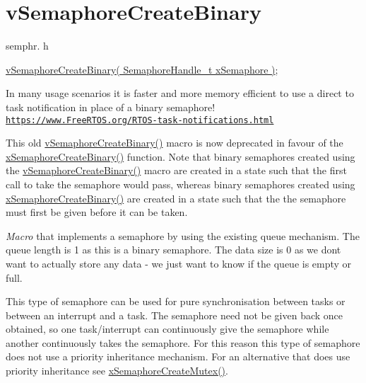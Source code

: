 \hypertarget{group__v_semaphore_create_binary}{}\section{v\+Semaphore\+Create\+Binary}
\label{group__v_semaphore_create_binary}
semphr. h 
\begin{DoxyPre}
\hyperlink{vendor_2ceedling_2plugins_2freertos_2src_2freertos_2include_2semphr_8h_ae10bffadd26fbd5bcce76bf33a83ef30}{vSemaphoreCreateBinary( SemaphoreHandle\_t xSemaphore )};
\end{DoxyPre}


In many usage scenarios it is faster and more memory efficient to use a direct to task notification in place of a binary semaphore! \href{https://www.FreeRTOS.org/RTOS-task-notifications.html}{\tt https\+://www.\+Free\+R\+T\+O\+S.\+org/\+R\+T\+O\+S-\/task-\/notifications.\+html}

This old \hyperlink{vendor_2ceedling_2plugins_2freertos_2src_2freertos_2include_2semphr_8h_ae10bffadd26fbd5bcce76bf33a83ef30}{v\+Semaphore\+Create\+Binary()} macro is now deprecated in favour of the \hyperlink{vendor_2ceedling_2plugins_2freertos_2src_2freertos_2include_2semphr_8h_acba963695e4f159d9bfa2394cae5badc}{x\+Semaphore\+Create\+Binary()} function. Note that binary semaphores created using the \hyperlink{vendor_2ceedling_2plugins_2freertos_2src_2freertos_2include_2semphr_8h_ae10bffadd26fbd5bcce76bf33a83ef30}{v\+Semaphore\+Create\+Binary()} macro are created in a state such that the first call to \textquotesingle{}take\textquotesingle{} the semaphore would pass, whereas binary semaphores created using \hyperlink{vendor_2ceedling_2plugins_2freertos_2src_2freertos_2include_2semphr_8h_acba963695e4f159d9bfa2394cae5badc}{x\+Semaphore\+Create\+Binary()} are created in a state such that the the semaphore must first be \textquotesingle{}given\textquotesingle{} before it can be \textquotesingle{}taken\textquotesingle{}.

{\itshape Macro} that implements a semaphore by using the existing queue mechanism. The queue length is 1 as this is a binary semaphore. The data size is 0 as we don\textquotesingle{}t want to actually store any data -\/ we just want to know if the queue is empty or full.

This type of semaphore can be used for pure synchronisation between tasks or between an interrupt and a task. The semaphore need not be given back once obtained, so one task/interrupt can continuously \textquotesingle{}give\textquotesingle{} the semaphore while another continuously \textquotesingle{}takes\textquotesingle{} the semaphore. For this reason this type of semaphore does not use a priority inheritance mechanism. For an alternative that does use priority inheritance see \hyperlink{vendor_2ceedling_2plugins_2freertos_2src_2freertos_2include_2semphr_8h_aa6a00aa9b91a9e5b3ebe4ae1c3f115c6}{x\+Semaphore\+Create\+Mutex()}.


